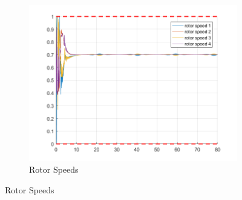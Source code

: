 \documentclass[11pt]{article}
\begin{document}
\begin{enumerate}
\begin{figure}[ht]
\begin{subfigure}[c]{0.3\linewidth}
            \includegraphics[width=\linewidth]{Plots_13_NonlinearModel_Lemniscate/06}
            \caption{Rotor Speeds}
        \end{subfigure}


\end{figure}
\end{enumerate}
\end{document}
